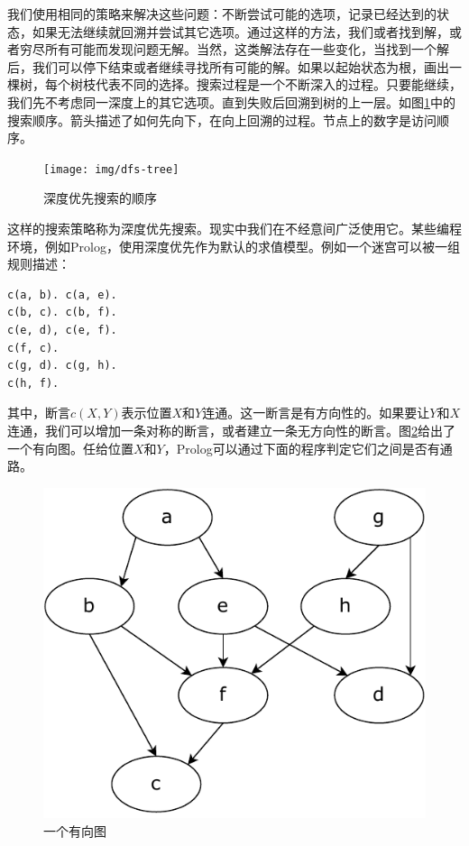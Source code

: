 \documentclass[b5paper]{ctexart}
\begin{document}
我们使用相同的策略来解决这些问题：不断尝试可能的选项，记录已经达到的状态，如果无法继续就回溯并尝试其它选项。通过这样的方法，我们或者找到解，或者穷尽所有可能而发现问题无解。当然，这类解法存在一些变化，当找到一个解后，我们可以停下结束或者继续寻找所有可能的解。如果以起始状态为根，画出一棵树，每个树枝代表不同的选择。搜索过程是一个不断深入的过程。只要能继续，我们先不考虑同一深度上的其它选项。直到失败后回溯到树的上一层。如图\ref{fig:dfs-tree}中的搜索顺序。箭头描述了如何先向下，在向上回溯的过程。节点上的数字是访问顺序。

\begin{figure}[htbp]
 \centering
 \texttt{[image: img/dfs-tree]}
 \caption{深度优先搜索的顺序}
 \label{fig:dfs-tree}
\end{figure}

这样的搜索策略称为深度优先搜索。现实中我们在不经意间广泛使用它。某些编程环境，例如Prolog，使用深度优先作为默认的求值模型。例如一个迷宫可以被一组规则描述：

\lstset{language=Prolog}
\begin{lstlisting}
c(a, b). c(a, e).
c(b, c). c(b, f).
c(e, d), c(e, f).
c(f, c).
c(g, d). c(g, h).
c(h, f).
\end{lstlisting}

其中，断言$c(X, Y)$表示位置$X$和$Y$连通。这一断言是有方向性的。如果要让$Y$和$X$连通，我们可以增加一条对称的断言，或者建立一条无方向性的断言。图\ref{fig:directed-graph}给出了一个有向图。任给位置$X$和$Y$，Prolog可以通过下面的程序判定它们之间是否有通路。

\begin{figure}[htbp]
 \centering
 \includegraphics[scale=0.5]{img/directed-graph}
 \caption{一个有向图}
 \label{fig:directed-graph}
\end{figure}
\end{document}

